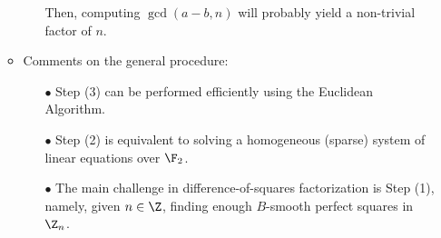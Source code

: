 \begin{itemize}
\begin{itemize}
\begin{enumerate}
						Then, computing $\gcd(a-b,n)$ will probably yield a non-trivial factor of $n$.
				\end{enumerate}
		\item	Comments on the general procedure:
				\begin{itemize}
				\item[$\bullet$]	Step (3) can be performed efficiently using the Euclidean Algorithm.
				\item[$\bullet$]	Step (2) is equivalent to solving a homogeneous (sparse) system of
								linear equations over $\F_{2}$.
				\item[$\bullet$]	The main challenge in difference-of-squares factorization is Step (1),
								namely, given $n \in \Z$, finding enough $B$-smooth perfect squares
								in $\Z_{n}$.
				\end{itemize}
		\end{itemize}
\end{itemize}
